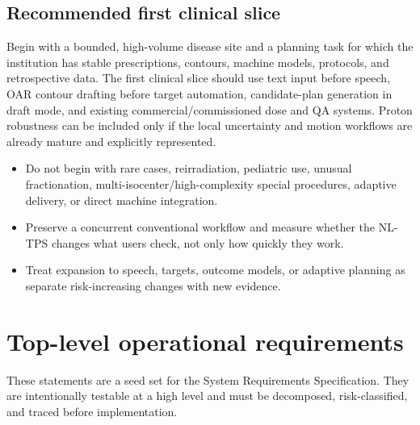 \documentclass[11pt,letterpaper]{article}
\begin{document}
\subsection{Recommended first clinical slice}

Begin with a bounded, high-volume disease site and a planning task for which the institution has stable prescriptions, contours, machine models, protocols, and retrospective data. The first clinical slice should use text input before speech, OAR contour drafting before target automation, candidate-plan generation in draft mode, and existing commercial\slash\allowbreak{}commissioned dose and QA systems. Proton robustness can be included only if the local uncertainty and motion workflows are already mature and explicitly represented.

\begin{itemize}
\item Do not begin with rare cases, reirradiation, pediatric use, unusual fractionation, multi-isocenter\slash\allowbreak{}high-complexity special procedures, adaptive delivery, or direct machine integration.
\item Preserve a concurrent conventional workflow and measure whether the NL-TPS changes what users check, not only how quickly they work.
\item Treat expansion to speech, targets, outcome models, or adaptive planning as separate risk-increasing changes with new evidence.
\end{itemize}

\section{Top-level operational requirements}

These statements are a seed set for the System Requirements Specification. They are intentionally testable at a high level and must be decomposed, risk-classified, and traced before implementation.
\end{document}
